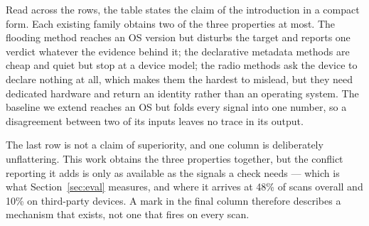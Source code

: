 \documentclass[conference]{IEEEtran}
\begin{document}
Read across the rows, the table states the claim of the introduction in a
compact form. Each existing family obtains two of the three properties at
most. The flooding method reaches an OS version but disturbs the target and
reports one verdict whatever the evidence behind it; the declarative metadata
methods are cheap and quiet but stop at a device model; the radio methods ask
the device to declare nothing at all, which makes them the hardest to
mislead, but they need dedicated hardware and return an identity rather than
an operating system. The baseline we extend reaches an OS but folds every
signal into one number, so a disagreement between two of its inputs leaves no
trace in its output.

The last row is not a claim of superiority, and one column is deliberately
unflattering. This work obtains the three properties together, but the
conflict reporting it adds is only as available as the signals a check needs
--- which is what Section~\ref{sec:eval} measures, and where it arrives at
48\% of scans overall and 10\% on third-party devices. A mark in the final
column therefore describes a mechanism that exists, not one that fires on
every scan.
\end{document}
